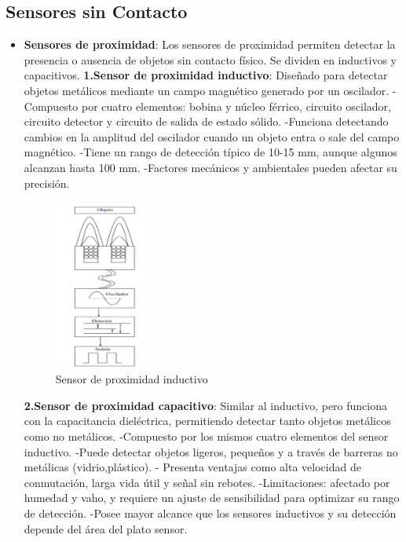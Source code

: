 \documentclass{article}
\begin{document}
	\subsection{Sensores sin Contacto}
		\begin{itemize}
		\item \textbf{Sensores de proximidad}: Los sensores de proximidad permiten detectar la presencia o ausencia de objetos sin contacto físico. Se dividen en inductivos y capacitivos.
		\subitem \textbf{ 1.Sensor de proximidad inductivo}: Diseñado para detectar objetos metálicos mediante un campo magnético generado
		por un oscilador.
		\subsubitem -Compuesto por cuatro elementos: bobina y núcleo férrico, circuito oscilador, circuito
		detector y circuito de salida de estado sólido.
		\subsubitem -Funciona detectando cambios en la amplitud del oscilador cuando un objeto entra o
		sale del campo magnético.
		\subsubitem -Tiene un rango de detección típico de 10-15 mm, aunque algunos alcanzan hasta
		100 mm.
		\subsubitem -Factores mecánicos y ambientales pueden afectar su precisión.
		\begin{figure}[H]
			\centering
			\includegraphics[width=0.3\textwidth]{sensorproxin.png}
			\caption{Sensor de proximidad inductivo} 
		\end{figure}
		\subitem \textbf{ 2.Sensor de proximidad capacitivo}: Similar al inductivo, pero funciona con la capacitancia dieléctrica, permitiendo detectar tanto objetos metálicos como no metálicos.
		\subsubitem -Compuesto por los mismos cuatro elementos del sensor inductivo.
		\subsubitem -Puede detectar objetos ligeros, pequeños y a través de barreras no metálicas (vidrio,plástico).
		\subsubitem - Presenta ventajas como alta velocidad de conmutación, larga vida útil y señal sin rebotes.
		\subsubitem -Limitaciones: afectado por humedad y vaho, y requiere un ajuste de sensibilidad
		para optimizar su rango de detección.
		\subsubitem -Posee mayor alcance que los sensores inductivos y su detección depende del área del plato sensor.
		

\end{itemize}
\end{document}
